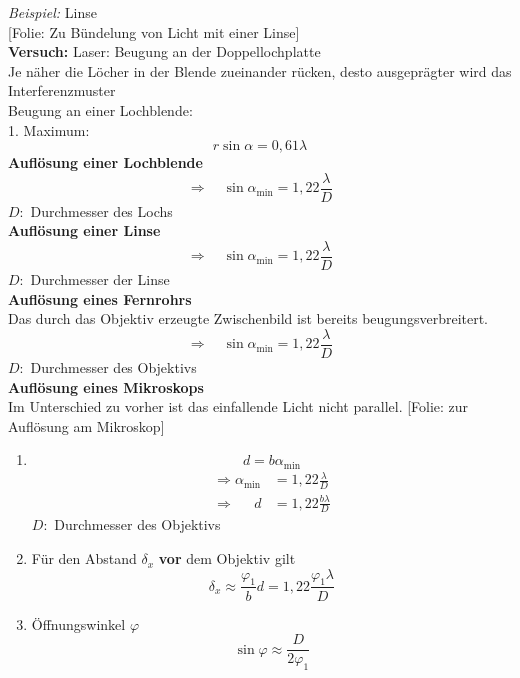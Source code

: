 \documentclass[titlepage,11pt,a4paper,ngerman]{report}
\newcommand{\tx}[1]{\textrm{#1}}
\newcommand{\folie}[1]{\color{gray}[Folie: #1]\color{black}}
\newcommand{\versuch}[1]{\color{red!50!black} \textbf{Versuch:} \color{black} #1\\ }
\newcommand{\lcom}[1]{\color{MidnightBlue}#1\color{black}}
\begin{document}
\emph{Beispiel:} Linse\\
\folie{Zu Bündelung von Licht mit einer Linse}\\[5pt]
\versuch{Laser: Beugung an der Doppellochplatte}
\lcom{Je näher die Löcher in der Blende zueinander rücken, desto ausgeprägter wird das Interferenzmuster}\\
Beugung an einer Lochblende:\\
1. Maximum:
\begin{equation*}
r \sin \alpha = 0{,}61 \lambda
\end{equation*}
\textbf{Auflösung einer Lochblende}
\begin{equation*}
\Rightarrow \quad \sin \alpha_{\tx{min}} = 1{,}22 \frac{\lambda}{D}
\end{equation*}
$ D: $ Durchmesser des Lochs\\
\textbf{Auflösung einer Linse}
\begin{equation*}
\Rightarrow \quad \sin \alpha_{\tx{min}} = 1{,}22 \frac{\lambda}{D}
\end{equation*}
$ D: $ Durchmesser der Linse\\
\textbf{Auflösung eines Fernrohrs}\\
Das durch das Objektiv erzeugte Zwischenbild ist bereits beugungsverbreitert.
\begin{equation*}
\Rightarrow \quad \sin \alpha_{\tx{min}} = 1{,}22 \frac{\lambda}{D}
\end{equation*}
$ D: $ Durchmesser des Objektivs\\
\textbf{Auflösung eines Mikroskops}\\
Im Unterschied zu vorher ist das einfallende Licht nicht parallel. \folie{zur Auflösung am Mikroskop}
\begin{enumerate}[(1)]
	\item \begin{equation*}
	d = b \alpha_{\tx{min}}
	\end{equation*}
	\begin{align*}
	\Rightarrow \alpha_{\tx{min}} &= 1{,}22 \frac{\lambda}{D} \\
	\Rightarrow \quad \: \, d &= 1{,}22 \frac{b \lambda}{D}
	\end{align*}
	$ D: $ Durchmesser des Objektivs
	\item Für den Abstand $ \delta_x $ \textbf{vor} dem Objektiv gilt
	\begin{equation*}
	\delta_x \approx \frac{\varphi_1}{b} d = 1{,}22 \frac{\varphi_1 \lambda}{D}
	\end{equation*}
	\item Öffnungswinkel $ \varphi $
	\begin{equation*}
	\sin \varphi \approx \frac{D}{2 \varphi_1}
	\end{equation*}
\end{enumerate}
\end{document}
